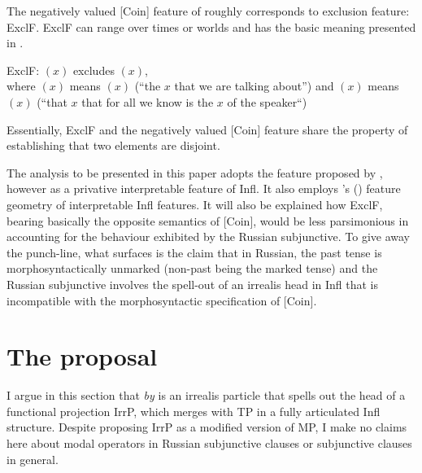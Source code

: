 \documentclass[output=paper,
modfonts,
newtxmath,
hidelinks,
]{langscibook}
\begin{document}
The negatively valued [Coin] feature of \citet{RitterWiltschko2005,RitterWiltschko2014} roughly corresponds to   exclusion feature: ExclF. ExclF can range over times or worlds and has the basic meaning presented in .

\ea \label{ex21}
ExclF: $(x)$ excludes $(x)$,\\where {}$(x)$ means $(x)$ (“the $x$ that we are talking about”) and $(x)$ means $(x)$ (“that $x$ that for all we know is the $x$ of the speaker“)
    \hfill \citep[246]{Iatridou2000}
	\z
\z

\noindent Essentially, ExclF and the negatively valued [Coin] feature share the property of establishing that two elements are disjoint.

The analysis to be presented in this paper adopts the feature proposed by \citet{RitterWiltschko2005,RitterWiltschko2009}, however as a privative interpretable feature of Infl. It also employs \citeauthor{Cowper2002}'s (\citeyear{Cowper2002,Cowper2005}) feature geometry of interpretable Infl features. It will also be explained how ExclF, bearing basically the opposite semantics of [Coin], would be less parsimonious in accounting for the behaviour exhibited by the Russian subjunctive. To give away the punch-line, what surfaces is the claim that in Russian, the past tense is morphosyntactically unmarked (non-past being the marked tense) and the Russian subjunctive involves the spell-out of an irrealis head in Infl that is incompatible with the morphosyntactic specification of [Coin]. 

\section{The proposal}\label{s4}

I argue in this section that \textit{by} is an irrealis particle that spells out the head of a functional projection IrrP, which merges with TP in a fully articulated Infl structure. Despite proposing IrrP as a modified version of  MP, I make no claims here about modal operators in Russian subjunctive clauses or subjunctive clauses in general. 
\end{document}
